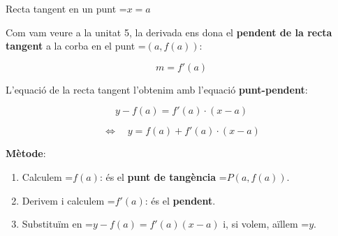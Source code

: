 \documentclass[11pt,a4paper]{article}
\newcommand{\fmm}[1]{\setbox0=\hbox{$#1$}\ifdim\wd0>\linewidth\[#1\]\else\mbox{\box0}\fi}
\newcommand{\fmuline}[1]{\textbf{\color{fmaccent}#1}}
\begin{document}
  
\begin{fmdef}{Recta tangent en un punt \fmm{x=a}}
\par\noindent \begin{minipage}[t]{0.48\linewidth}\vspace{0pt}\raggedright Com vam veure a la unitat 5, la derivada ens dona el \textbf{pendent de la recta tangent} a la corba en el punt \fmm{(a,f(a))}:

          
\[m=f'(a)\]

          

L'equació de la recta tangent l'obtenim amb l'equació \textbf{punt-pendent}:

          
\[y-f(a)=f'(a)\cdot(x-a)\]

\[\Longleftrightarrow\quad y=f(a)+f'(a)\cdot(x-a)\]
\end{minipage}\hfill\begin{minipage}[t]{0.48\linewidth}\vspace{0pt}\raggedright \begin{center}\end{center}\end{minipage}\par\medskip

     \newpage

\fmuline{Mètode}:

      
\begin{enumerate}
\item Calculem \fmm{f(a)}: és el \textbf{punt de tangència} \fmm{P(a,f(a))}.
\item Derivem i calculem \fmm{f'(a)}: és el \textbf{pendent}.
\item Substituïm en \fmm{y-f(a)=f'(a)(x-a)} i, si volem, aïllem \fmm{y}.
\end{enumerate}
\end{fmdef}
\end{document}

